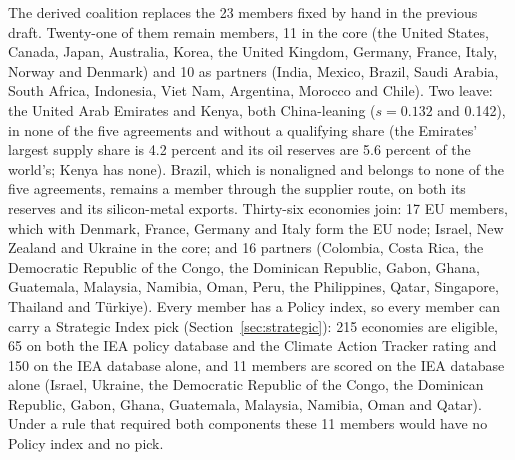 The derived coalition replaces the 23 members fixed by hand in the previous draft. Twenty-one of
them remain members, 11 in the core (the United States, Canada, Japan, Australia, Korea, the
United Kingdom, Germany, France, Italy, Norway and Denmark) and 10 as partners (India, Mexico,
Brazil, Saudi Arabia, South Africa, Indonesia, Viet Nam, Argentina, Morocco and Chile). Two leave:
the United Arab Emirates and Kenya, both China-leaning ($s=0.132$ and 0.142), in none of the five
agreements and without a qualifying share (the Emirates' largest supply share is 4.2 percent and
its oil reserves are 5.6 percent of the world's; Kenya has none). Brazil, which is nonaligned and
belongs to none of the five agreements, remains a member through the supplier route, on both its
reserves and its silicon-metal exports. Thirty-six economies join: 17 EU members, which with Denmark, France,
Germany and Italy form the EU node; Israel, New Zealand and Ukraine in the core; and 16 partners
(Colombia, Costa Rica, the Democratic Republic of the Congo, the Dominican Republic, Gabon, Ghana,
Guatemala, Malaysia, Namibia, Oman, Peru, the Philippines, Qatar, Singapore, Thailand and
T\"urkiye). Every member has a Policy index, so every member can carry a Strategic Index pick
(Section~\ref{sec:strategic}): 215 economies are eligible, 65 on both the IEA policy database and
the Climate Action Tracker rating and 150 on the IEA database alone, and 11 members are scored on
the IEA database alone (Israel, Ukraine, the Democratic Republic of the Congo, the Dominican
Republic, Gabon, Ghana, Guatemala, Malaysia, Namibia, Oman and Qatar). Under a rule that required
both components these 11 members would have no Policy index and no pick.

